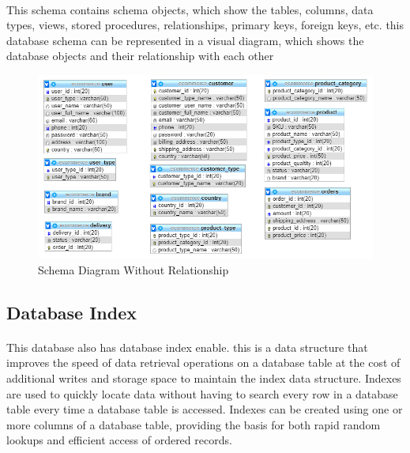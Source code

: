 \documentclass{article}
\begin{document}
	\paragraph{}
	This schema contains schema objects, which show the tables, columns, data types, views, stored procedures, relationships, primary keys, foreign keys, etc. this database schema can be represented in a visual diagram, which shows the database objects and their relationship with each other
		\begin{figure}[h!]
			\centering
			\includegraphics[width=5in]{images/schema_without_relationship}
			\caption{Schema Diagram Without Relationship}
			\label{fig:pic}
		\end{figure}
	\subsection{Database Index}
	\paragraph{}
	This database also has database index enable. this is a data structure that improves the speed of data retrieval operations on a database table at the cost of additional writes and storage space to maintain the index data structure. Indexes are used to quickly locate data without having to search every row in a database table every time a database table is accessed. Indexes can be created using one or more columns of a database table, providing the basis for both rapid random lookups and efficient access of ordered records.
	\pagebreak
	
\end{document}
